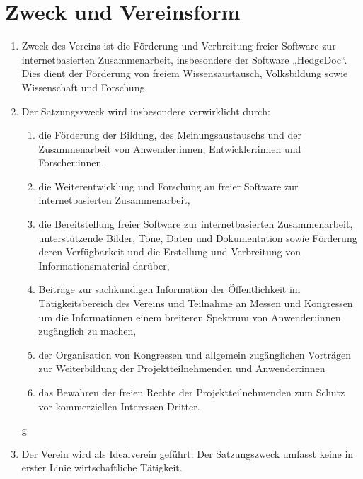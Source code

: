 \documentclass[12pt,paper=a4,ngerman]{scrreprt}
\begin{document}
	\section{Zweck und Vereinsform}
	\begin{enumerate}
		\item
			Zweck des Vereins ist die Förderung und Verbreitung freier Software zur internetbasierten Zusammenarbeit, insbesondere der Software „HedgeDoc“. Dies dient der Förderung von freiem Wissensaustausch, Volksbildung sowie Wissenschaft und Forschung.
		\item
			Der Satzungszweck wird insbesondere verwirklicht durch:
		    \begin{enumerate}
    			\item
    			    die Förderung der Bildung, des Meinungsaustauschs und der Zusammenarbeit von Anwender:innen, Entwickler:innen und Forscher:innen,
			    \item
			        die Weiterentwicklung und Forschung an freier Software zur internetbasierten Zusammenarbeit,
		        \item
		            die Bereitstellung freier Software zur internetbasierten Zusammenarbeit, unterstützende Bilder, Töne, Daten und Dokumentation sowie Förderung deren Verfügbarkeit und die Erstellung und Verbreitung von Informationsmaterial darüber,
	            \item
	                Beiträge zur sachkundigen Information der Öffentlichkeit im Tätigkeitsbereich des Vereins und Teilnahme an Messen und Kongressen um die Informationen einem breiteren Spektrum von Anwender:innen zugänglich zu machen,
	            \item
	                der Organisation von Kongressen und allgemein zugänglichen Vorträgen zur Weiterbildung der Projektteilnehmenden und Anwender:innen
	            \item
	                das Bewahren der freien Rechte der Projektteilnehmenden zum Schutz vor kommerziellen Interessen Dritter. 
		    \end{enumerate}g
		\item Der Verein wird als Idealverein geführt. Der Satzungszweck umfasst keine in erster Linie wirtschaftliche Tätigkeit.
	\end{enumerate}
	
\end{document}
